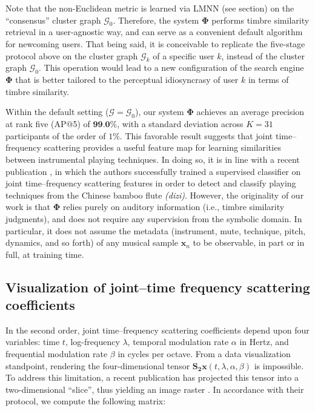 \documentclass{bmcart}
\newcommand{\lnameref}[1]{%
\bgroup
\let\nmu\MakeLowercase
\nameref{#1}\egroup}
\newcommand{\nmu}{}
\begin{document}
Note that the non-Euclidean metric is learned via LMNN (see \lnameref{sec:methods} section) on the ``consensus'' cluster graph $\mathcal{G}_0$.
Therefore, the system $\mathbf{\Phi}$ performs timbre similarity retrieval in a user-agnostic way, and can serve as a convenient default algorithm for newcoming users.
That being said, it is conceivable to replicate the five-stage protocol above on the cluster graph $\mathcal{G}_k$ of a specific user $k$, instead of the cluster graph $\mathcal{G}_0$.
This operation would lead to a new configuration of the search engine $\mathbf{\Phi}$ that is better tailored to the perceptual idiosyncrasy of user $k$ in terms of timbre similarity.

Within the default setting ($\mathcal{G}=\mathcal{G}_0$), our system $\mathbf{\Phi}$ achieves an average precision at rank five (AP@5) of $\textbf{99.0\%}$, with a standard deviation across $K=31$ participants of the order of $1\%$.
This favorable result suggests that joint time--frequency scattering provides a useful feature map for learning similarities between instrumental playing techniques.
In doing so, it is in line with a recent publication \cite{wang2020icassp}, in which the authors successfully trained a supervised classifier on joint time--frequency scattering features in order to detect and classify playing techniques from the Chinese bamboo flute \emph{(dizi)}.
However, the originality of our work is that $\mathbf{\Phi}$ relies purely on auditory information (i.e., timbre similarity judgments), and does not require any supervision from the symbolic domain.
In particular, it does not assume the metadata (instrument, mute, technique, pitch, dynamics, and so forth) of any musical sample $\boldsymbol{x}_n$ to be observable, in part or in full, at training time.



\subsection*{Visualization of joint--time frequency scattering coefficients}
\label{sec:visualization}

In the second order, joint time--frequency scattering coefficients depend upon four variables: time $t$, log-frequency $\lambda$, temporal modulation rate $\alpha$ in Hertz, and frequential modulation rate $\beta$ in cycles per octave.
From a data visualization standpoint, rendering the four-dimensional tensor $\mathbf{S_2}\boldsymbol{x}(t, \lambda, \alpha, \beta)$ is impossible.
To address this limitation, a recent publication has projected this tensor into a two-dimensional ``slice'', thus yielding an image raster \cite{anden2019tsp}.
In accordance with their protocol, we compute the following matrix:
\end{document}
